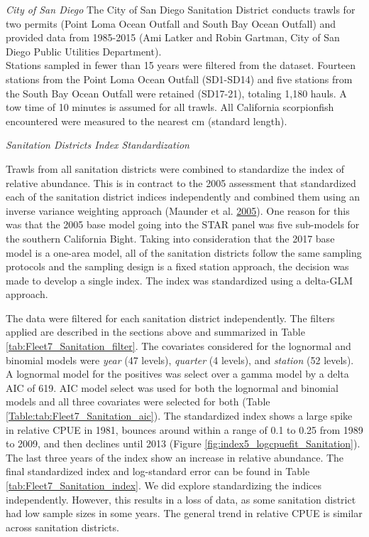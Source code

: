\documentclass[12pt,]{article}
\begin{document}
\emph{City of San Diego} The City of San Diego Sanitation District
conducts trawls for two permits (Point Loma Ocean Outfall and South Bay
Ocean Outfall) and provided data from 1985-2015 (Ami Latker and Robin
Gartman, City of San Diego Public Utilities Department).\\
Stations sampled in fewer than 15 years were filtered from the dataset.
Fourteen stations from the Point Loma Ocean Outfall (SD1-SD14) and five
stations from the South Bay Ocean Outfall were retained (SD17-21),
totaling 1,180 hauls. A tow time of 10 minutes is assumed for all
trawls. All California scorpionfish encountered were measured to the
nearest cm (standard length).

\emph{Sanitation Districts Index Standardization}

Trawls from all sanitation districts were combined to standardize the
index of relative abundance. This is in contract to the 2005 assessment
that standardized each of the sanitation district indices independently
and combined them using an inverse variance weighting approach (Maunder
et al. \protect\hyperlink{ref-Maunder2005}{2005}). One reason for this
was that the 2005 base model going into the STAR panel was five
sub-models for the southern California Bight. Taking into consideration
that the 2017 base model is a one-area model, all of the sanitation
districts follow the same sampling protocols and the sampling design is
a fixed station approach, the decision was made to develop a single
index. The index was standardized using a delta-GLM approach.

The data were filtered for each sanitation district independently. The
filters applied are described in the sections above and summarized in
Table \ref{tab:Fleet7_Sanitation_filter}. The covariates considered for
the lognormal and binomial models were \emph{year} (47 levels),
\emph{quarter} (4 levels), and \emph{station} (52 levels). A lognormal
model for the positives was select over a gamma model by a delta AIC of
619. AIC model select was used for both the lognormal and binomial
models and all three covariates were selected for both (Table
\ref{Table:tab:Fleet7_Sanitation_aic}). The standardized index shows a
large spike in relative CPUE in 1981, bounces around within a range of
0.1 to 0.25 from 1989 to 2009, and then declines until 2013 (Figure
\ref{fig:index5_logcpuefit_Sanitation}). The last three years of the
index show an increase in relative abundance. The final standardized
index and log-standard error can be found in Table
\ref{tab:Fleet7_Sanitation_index}. We did explore standardizing the
indices independently. However, this results in a loss of data, as some
sanitation district had low sample sizes in some years. The general
trend in relative CPUE is similar across sanitation districts.
\end{document}
